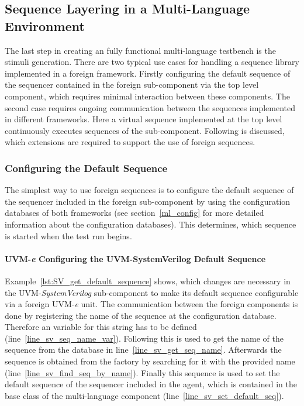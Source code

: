 \subsection{Sequence Layering in a Multi-Language Environment}
The last step in creating an fully functional multi-language testbench is the stimuli generation. There are two typical
use cases for handling a sequence library implemented in a foreign framework. Firstly configuring the default sequence
of the sequencer contained in the foreign sub-component via the top level component, which requires minimal interaction between
these components. The second case requires ongoing communication between the sequences implemented in different
frameworks. Here a virtual sequence implemented at the top level continuously executes sequences of the sub-component.
Following is discussed, which extensions are required to support the use of foreign sequences.

\subsubsection{Configuring the Default Sequence}
The simplest way to use foreign sequences is to configure the default sequence of the sequencer included in the foreign
sub-component by using the configuration databases of both frameworks (see section~\ref{ml_config} for more detailed
information about the configuration databases). This determines, which sequence is started when the test run begins.

\paragraph{UVM-\textit{e} Configuring the UVM-SystemVerilog Default Sequence}
Example~\ref{lst:SV_get_default_sequence} shows, which changes are necessary in the UVM-\emph{SystemVerilog} sub-component to make its default sequence configurable via a foreign UVM-\textit{e} unit. The communication between the foreign components is done by registering the name of the sequence at the configuration database. Therefore an variable for this string has to be defined (line~\ref{line_sv_seq_name_var}). Following this is used to get the name of the sequence from the database in line~\ref{line_sv_get_seq_name}. Afterwards the sequence is obtained from the factory by searching for it with the provided name (line~\ref{line_sv_find_seq_by_name}). Finally this sequence is used to set the default sequence of the sequencer included in the agent, which is contained in the base class of the multi-language component (line~\ref{line_sv_set_default_seq}).   


